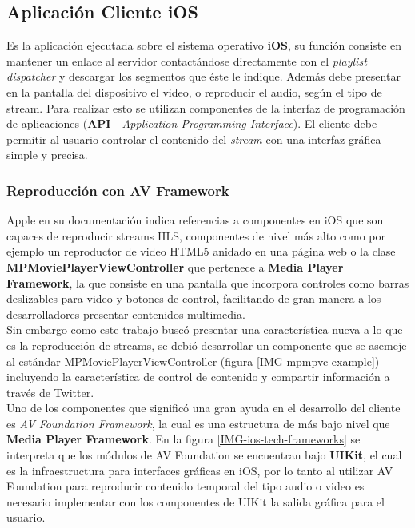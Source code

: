 	\subsection{Aplicación Cliente iOS}
Es la aplicación ejecutada sobre el sistema operativo \textbf{iOS}, su función consiste en mantener un enlace al servidor contactándose directamente con el \textit{playlist dispatcher} y descargar los segmentos que éste le indique. Además debe presentar en la pantalla del dispositivo el video, o reproducir el audio, según el tipo de stream. Para realizar esto se utilizan componentes de la interfaz de programación de aplicaciones (\textbf{API} - \textit{Application Programming Interface}). El cliente debe permitir al usuario controlar el contenido del \textit{stream} con una interfaz gráfica simple y precisa.

		\subsubsection{Reproducción con AV Framework}
Apple en su documentación indica referencias a componentes en iOS que son capaces de reproducir streams HLS, componentes de nivel más alto como por ejemplo un reproductor de video HTML5 anidado en una página web o la clase \textbf{MPMoviePlayerViewController} que pertenece a \textbf{Media Player Framework}, la que consiste en una pantalla que incorpora controles como barras deslizables para video y botones de control, facilitando de gran manera a los desarrolladores presentar contenidos multimedia. \\

Sin embargo como este trabajo buscó presentar una característica nueva a lo que es la reproducción de streams, se debió desarrollar un componente que se asemeje al estándar MPMoviePlayerViewController (figura \ref{IMG-mpmpvc-example}) incluyendo la característica de control de contenido y compartir información a través de Twitter.\\

Uno de los componentes que significó una gran ayuda en el desarrollo del cliente es \textit{AV Foundation Framework}, la cual es una estructura de más bajo nivel que \textbf{Media Player Framework}. 
En la figura \ref{IMG-ios-tech-frameworks} se interpreta que los módulos de AV Foundation se encuentran bajo \textbf{UIKit}, el cual es la infraestructura para interfaces gráficas en iOS, por lo tanto al utilizar AV Foundation para reproducir contenido temporal del tipo audio o video es necesario implementar con los componentes de UIKit la salida gráfica para el usuario.\\

